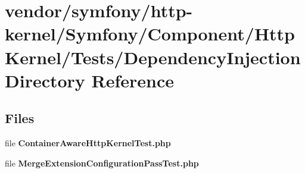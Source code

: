 \section{vendor/symfony/http-\/kernel/\+Symfony/\+Component/\+Http\+Kernel/\+Tests/\+Dependency\+Injection Directory Reference}
\label{dir_a0e58f27c059ee0b0ffb3a7e76b52351}
\subsection*{Files}
\begin{DoxyCompactItemize}
\item 
file {\bf Container\+Aware\+Http\+Kernel\+Test.\+php}
\item 
file {\bf Merge\+Extension\+Configuration\+Pass\+Test.\+php}
\end{DoxyCompactItemize}
